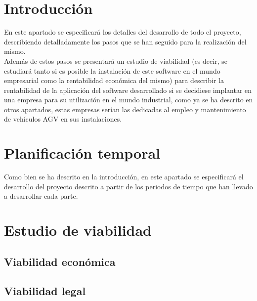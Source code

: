 
\section{Introducción}
En este apartado se especificará los detalles del desarrollo de todo el proyecto, describiendo detalladamente los pasos que se han seguido para la realización del mismo.\\
Además de estos pasos se presentará un estudio de viabilidad (es decir, se estudiará tanto si es posible la instalación de este software en el mundo empresarial como la rentabilidad económica del mismo) para describir la rentabilidad de la aplicación del software desarrollado si se decidiese implantar en una empresa para su utilización en el mundo industrial, como ya se ha descrito en otros apartados, estas empresas serían las dedicadas al empleo y mantenimiento de vehículos AGV en sus instalaciones.\\
\section{Planificación temporal}
Como bien se ha descrito en la introducción, en este apartado se especificará el desarrollo del proyecto descrito a partir de los periodos de tiempo que han llevado a desarrollar cada parte.
\section{Estudio de viabilidad}

\subsection{Viabilidad económica}

\subsection{Viabilidad legal}


